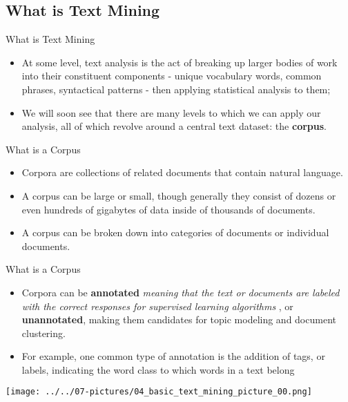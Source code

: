 \documentclass[11pt]{beamer}
\begin{document}
\subsection{What is Text Mining	 \\ \scalebox{0.8}{And why is so important!}}
\begin{frame}{What is Text Mining}
	\begin{itemize}
		\item At some level, text analysis is the act of breaking up larger bodies of work into their constituent components - unique vocabulary words, common phrases, syntactical patterns - then applying statistical analysis to them;
		\item We will soon see that there are many levels to which we can apply our analysis, all of which revolve around a central text dataset: the \textbf{corpus}.
	\end{itemize}
\end{frame}
\begin{frame}{What is a Corpus}
	\begin{itemize}
		\item Corpora are collections of related documents that contain natural language. 
		\item A corpus can be large or small, though generally they consist of dozens or even hundreds of gigabytes of data inside of thousands of documents.
		\item A corpus can be broken down into categories of documents or individual documents.
	\end{itemize}
\end{frame}
\begin{frame}{What is a Corpus}
	\begin{itemize}
		\item Corpora can be \textbf{annotated}  \textit{meaning that the text or documents are labeled with the correct responses for supervised learning algorithms }, or \textbf{unannotated}, making them candidates for topic modeling and document clustering.
		\item  For example, one common type of annotation is the addition of tags, or labels, indicating the word class to which words in a text belong
	\end{itemize}
	\begin{center}
	\texttt{[image: ../../07-pictures/04\_basic\_text\_mining\_picture\_00.png]}
	\end{center}
\end{frame}
\end{document}
